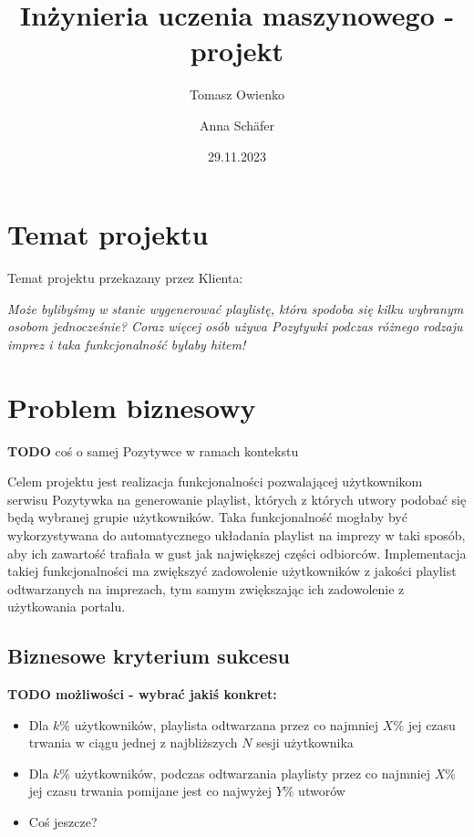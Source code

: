 \documentclass[10pt,a4paper]{article}
\title{Inżynieria uczenia maszynowego - projekt}
\author{Tomasz Owienko \and Anna Schäfer}
\date{29.11.2023}
\begin{document}
\maketitle

\section{Temat projektu}




Temat projektu przekazany przez Klienta:

\begin{displayquote}
	\textit{Może bylibyśmy w stanie wygenerować playlistę, która spodoba się kilku wybranym osobom jednocześnie? Coraz więcej osób używa Pozytywki podczas różnego rodzaju imprez i taka funkcjonalność byłaby hitem!}
\end{displayquote}


\section{Problem biznesowy}

\textbf{TODO} coś o samej Pozytywce	w ramach kontekstu

Celem projektu jest realizacja funkcjonalności pozwalającej użytkownikom serwisu Pozytywka na generowanie playlist, których z których utwory podobać się będą wybranej grupie użytkowników. Taka funkcjonalność mogłaby być wykorzystywana do automatycznego układania playlist na imprezy w taki sposób, aby ich zawartość trafiała w gust jak największej części odbiorców. Implementacja takiej funkcjonalności ma zwiększyć zadowolenie użytkowników z jakości playlist odtwarzanych na imprezach, tym samym zwiększając ich zadowolenie z użytkowania portalu.

\subsection*{Biznesowe kryterium sukcesu}
\textbf{TODO możliwości - wybrać jakiś konkret:}
\begin{itemize}
\item Dla $k\%$ użytkowników, playlista odtwarzana przez co najmniej $X\%$ jej czasu trwania w ciągu jednej z najbliższych $N$ sesji użytkownika 
\item Dla $k\%$ użytkowników, podczas odtwarzania playlisty przez co najmniej $X\%$ jej czasu trwania pomijane jest co najwyżej $Y\%$ utworów
\item Coś jeszcze?
\end{itemize}
\end{document}
